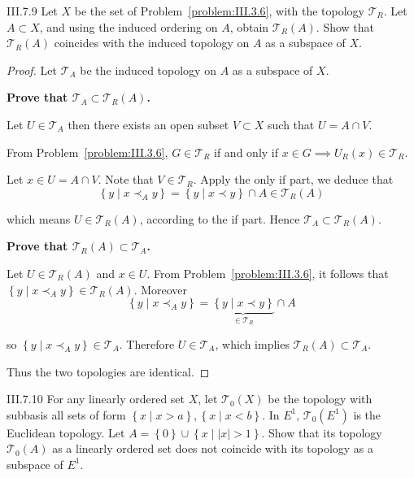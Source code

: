 \begin{problem}{III.7.9}
Let \(X\) be the set of Problem~\ref{problem:III.3.6}, with the topology \( \mathscr{T}_{R} \). Let \( A \subset X \), and using the induced ordering on \(A\), obtain \( \mathscr{T}_{R}(A) \). Show that \( \mathscr{T}_{R}(A) \) coincides with the induced topology on \(A\) as a subspace of \(X\).
\end{problem}

\begin{proof}
	Let \( \mathscr{T}_{A} \) be the induced topology on \(A\) as a subspace of \(X\).

	\textbf{Prove that \( \mathscr{T}_{A} \subset \mathscr{T}_{R}(A) \).}

	Let \( U \in \mathscr{T}_{A} \) then there exists an open subset \( V \subset X \) such that \( U = A \cap V \).

	From Problem~\ref{problem:III.3.6}, \( G \in \mathscr{T}_{R} \) if and only if \( x \in G \implies U_{R}(x) \in \mathscr{T}_{R} \).

	Let \( x \in U = A \cap V \). Note that \( V \in \mathscr{T}_{R} \). Apply the only if part, we deduce that
	\[
		\left\{ y \mid x \prec_{A} y \right\} = \left\{ y \mid x \prec y \right\} \cap A \in \mathscr{T}_{R}(A)
	\]

	which means \( U \in \mathscr{T}_{R}(A) \), according to the if part. Hence \( \mathscr{T}_{A} \subset \mathscr{T}_{R}(A) \).

	\textbf{Prove that \( \mathscr{T}_{R}(A) \subset \mathscr{T}_{A} \).}

	Let \( U \in \mathscr{T}_{R}(A) \) and \( x \in U \). From Problem~\ref{problem:III.3.6}, it follows that \( \left\{ y \mid x \prec_{A} y \right\} \in \mathscr{T}_{R}(A) \). Moreover
	\[
		\left\{ y \mid x \prec_{A} y \right\} = \underbrace{\left\{ y \mid x \prec y \right\}}_{\in \mathscr{T}_{R}} \cap A
	\]

	so \( \left\{ y \mid x \prec_{A} y \right\} \in \mathscr{T}_{A} \). Therefore \( U \in \mathscr{T}_{A} \), which implies \( \mathscr{T}_{R}(A) \subset \mathscr{T}_{A} \).

	Thus the two topologies are identical.
\end{proof}

\begin{problem}{III.7.10}
For any linearly ordered set \(X\), let \( \mathscr{T}_{0}(X) \) be the topology with subbasis all sets of form \( \left\{ x \mid x > a \right\}, \left\{ x \mid x < b \right\} \). In \( E^{1} \), \( \mathscr{T}_{0}(E^{1}) \) is the Euclidean topology. Let \( A = \left\{0\right\} \cup \left\{ x \mid \left\vert{x}\right\vert > 1 \right\} \). Show that its topology \( \mathscr{T}_{0}(A) \) as a linearly ordered set does not coincide with its topology as a subspace of \(E^{1}\).
\end{problem}

